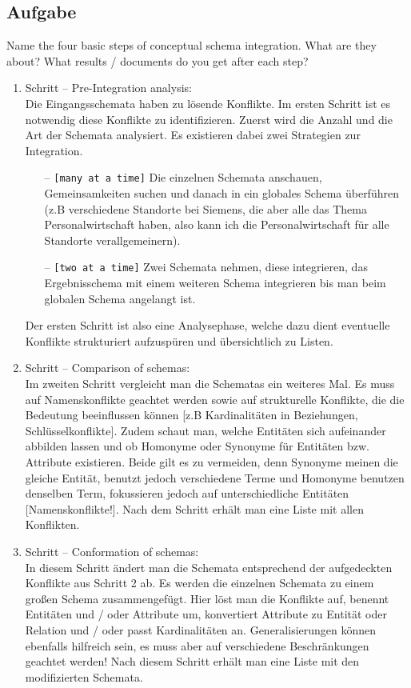\documentclass[11pt,a4paper,DIV=9]{scrartcl}
\newcounter{temp}
\newcommand{\aufgabe}[1]{
  \setcounter{temp}{\value{subsection}}
  \setcounter{subsection}{#1}
  \addtocounter{subsection}{-1}
  \subsection{Aufgabe}
  \setcounter{subsection}{\value{temp}}
}
\begin{document}
\aufgabe{2}
  Name the four basic steps of conceptual schema integration. What are they about? What results / documents do you get after each step?
  \begin{enumerate}
    \item Schritt -- Pre-Integration analysis: \\ Die Eingangsschemata haben zu l\"osende Konflikte. Im ersten Schritt ist es notwendig diese Konflikte zu identifizieren. Zuerst wird die Anzahl und die Art der Schemata analysiert. Es existieren dabei zwei Strategien zur Integration.
    \begin{itemize}
      \item[--] \texttt{[many at a time]} Die einzelnen Schemata anschauen, Gemeinsamkeiten suchen und danach in ein globales Schema \"uberf\"uhren (z.B verschiedene Standorte bei Siemens, die aber alle das Thema Personalwirtschaft haben, also kann ich die Personalwirtschaft f\"ur alle Standorte verallgemeinern). 
      \item[--] \texttt{[two at a time]} Zwei Schemata nehmen, diese integrieren, das Ergebnisschema mit einem weiteren Schema integrieren bis man beim globalen Schema angelangt ist. 
    \end{itemize}
    Der ersten Schritt ist also eine Analysephase, welche dazu dient eventuelle Konflikte strukturiert aufzuspüren und übersichtlich zu Listen.
    \item Schritt -- Comparison of schemas: \\
    Im zweiten Schritt vergleicht man die Schematas ein weiteres Mal. Es muss auf Namenskonflikte geachtet werden sowie auf strukturelle Konflikte, die die Bedeutung beeinflussen k\"onnen [z.B Kardinalit\"aten in Beziehungen, Schl\"usselkonflikte]. Zudem schaut man, welche Entit\"aten sich aufeinander abbilden lassen und ob Homonyme oder Synonyme f\"ur Entit\"aten bzw. Attribute existieren. Beide gilt es zu vermeiden, denn Synonyme meinen die gleiche Entit\"at, benutzt jedoch verschiedene Terme und Homonyme benutzen denselben Term, fokussieren jedoch auf unterschiedliche Entit\"aten [Namenskonflikte!]. Nach dem Schritt erh\"alt man eine Liste mit allen Konflikten.
    \item Schritt -- Conformation of schemas: \\
    In diesem Schritt \"andert man die Schemata entsprechend der aufgedeckten Konflikte aus Schritt 2 ab. Es werden die einzelnen Schemata zu einem großen Schema zusammengef\"ugt. Hier l\"ost man die Konflikte auf, benennt Entit\"aten und / oder Attribute um, konvertiert Attribute zu Entit\"at oder Relation und / oder passt Kardinalit\"aten an. Generalisierungen k\"onnen ebenfalls hilfreich sein, es muss aber auf verschiedene Beschr\"ankungen geachtet werden! Nach diesem Schritt erh\"alt man eine Liste mit den modifizierten Schemata.

\end{enumerate}
\end{document}

